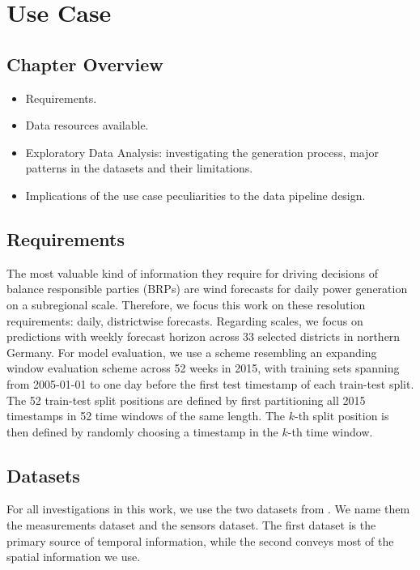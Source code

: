 \graphicspath{{./figures/usecase/}}

\chapter{Use Case}

\section*{Chapter Overview}
\begin{itemize}
    \item Requirements.
    \item Data resources available.
    \item Exploratory Data Analysis: investigating the generation process, major patterns in the datasets and their limitations.
    \item Implications of the use case peculiarities to the data pipeline design.
\end{itemize}
\pagebreak


\section{Requirements}\label{sec:reqs}
The most valuable kind of information they require for driving decisions of balance responsible parties (BRPs) are wind forecasts for daily power generation on a subregional scale.
Therefore, we focus this work on these resolution requirements: daily, districtwise forecasts.
Regarding scales, we focus on predictions with weekly forecast horizon across 33 selected districts in northern Germany.
For model evaluation, we use a scheme resembling an expanding window evaluation scheme across 52 weeks in 2015, with training sets spanning from 2005-01-01 to one day before the first test timestamp of each train-test split.
The 52 train-test split positions are defined by first partitioning all 2015 timestamps in 52 time windows of the same length.
The $k$-th split position is then defined by randomly choosing a timestamp in the $k$-th time window.

\section{Datasets}\label{sec:datasets}
For all investigations in this work, we use the two datasets from \cite{becker2017completion}.
We name them the measurements dataset and the sensors dataset.
The first dataset is the primary source of temporal information, while the second conveys most of the spatial information we use.

